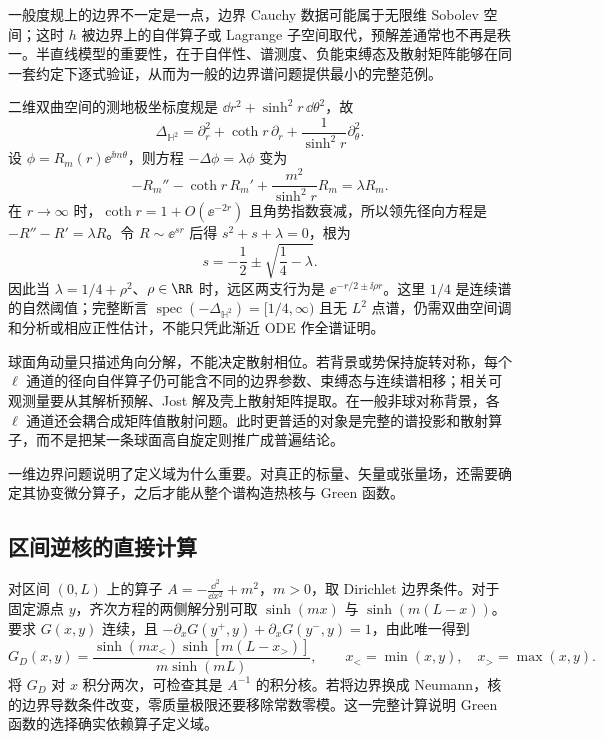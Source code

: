 一般度规上的边界不一定是一点，边界 Cauchy 数据可能属于无限维 Sobolev 空间；这时 $h$ 被边界上的自伴算子或 Lagrange 子空间取代，预解差通常也不再是秩一。半直线模型的重要性，在于自伴性、谱测度、负能束缚态及散射矩阵能够在同一套约定下逐式验证，从而为一般的边界谱问题提供最小的完整范例。

二维双曲空间的测地极坐标度规是 $\dd r^2+\sinh^2r\,\dd\theta^2$，故
\[
\Delta_{\mathbb H^2}=\partial_r^2+\coth r\,\partial_r
+\frac{1}{\sinh^2r}\partial_\theta^2.
\]
设 $\phi=R_m(r)\ee^{\ii m\theta}$，则方程 $-\Delta\phi=\lambda\phi$ 变为
\begin{equation}\label{eq:ghs-r6-hyperbolic-radial}
-R_m''-\coth r\,R_m'
+\frac{m^2}{\sinh^2r}R_m=\lambda R_m.
\end{equation}
在 $r\to\infty$ 时，$\coth r=1+O(\ee^{-2r})$ 且角势指数衰减，所以领先径向方程是
$-R''-R'=\lambda R$。令 $R\sim\ee^{sr}$ 后得 $s^2+s+\lambda=0$，根为
\[
s=-\frac12\pm\sqrt{\frac14-\lambda}.
\]
因此当 $\lambda=1/4+\rho^2$、$\rho\in\RR$ 时，远区两支行为是 $\ee^{-r/2\pm\ii\rho r}$。这里 $1/4$ 是连续谱的自然阈值；完整断言 $\operatorname{spec}(-\Delta_{\mathbb H^2})=[1/4,\infty)$ 且无 $L^2$ 点谱，仍需双曲空间调和分析或相应正性估计，不能只凭此渐近 ODE 作全谱证明。

球面角动量只描述角向分解，不能决定散射相位。若背景或势保持旋转对称，每个 $\ell$ 通道的径向自伴算子仍可能含不同的边界参数、束缚态与连续谱相移；相关可观测量要从其解析预解、Jost 解及壳上散射矩阵提取。在一般非球对称背景，各 $\ell$ 通道还会耦合成矩阵值散射问题。此时更普适的对象是完整的谱投影和散射算子，而不是把某一条球面高自旋定则推广成普遍结论。

一维边界问题说明了定义域为什么重要。对真正的标量、矢量或张量场，还需要确定其协变微分算子，之后才能从整个谱构造热核与 Green 函数。

\subsection{区间逆核的直接计算}
\label{app:ghs-spectral-tests}



对区间 $(0,L)$ 上的算子 $A=-\frac{\dd^2}{\dd x^2}+m^2$，$m>0$，取 Dirichlet 边界条件。对于固定源点 $y$，齐次方程的两侧解分别可取 $\sinh(mx)$ 与 $\sinh(m(L-x))$。要求 $G(x,y)$ 连续，且
$-\partial_xG(y^+,y)+\partial_xG(y^-,y)=1$，由此唯一得到
\begin{equation}\label{eq:ghs-dirichlet-green-interval}
 G_D(x,y)=\frac{\sinh(m x_<)\sinh[m(L-x_>)]}{m\sinh(mL)},
 \qquad x_<=\min(x,y),\quad x_>=\max(x,y).
\end{equation}
将 $G_D$ 对 $x$ 积分两次，可检查其是 $A^{-1}$ 的积分核。若将边界换成 Neumann，核的边界导数条件改变，零质量极限还要移除常数零模。这一完整计算说明 Green 函数的选择确实依赖算子定义域。

